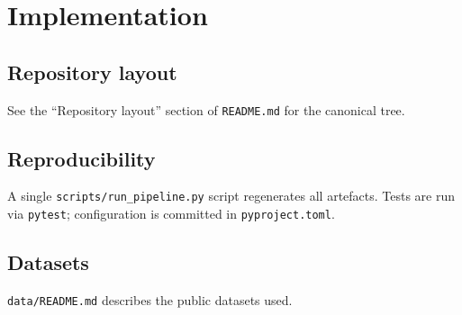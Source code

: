 \chapter{Implementation}

\section{Repository layout}
See the ``Repository layout'' section of \texttt{README.md} for the canonical
tree.

\section{Reproducibility}
A single \texttt{scripts/run\_pipeline.py} script regenerates all artefacts.
Tests are run via \texttt{pytest}; configuration is committed in
\texttt{pyproject.toml}.

\section{Datasets}
\texttt{data/README.md} describes the public datasets used.

